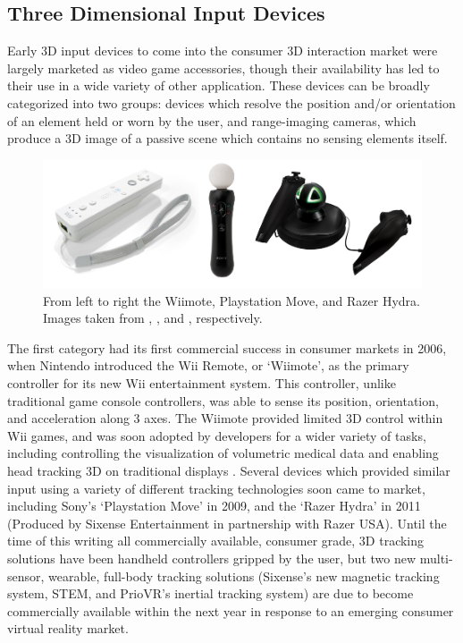 \subsection{Three Dimensional Input Devices}

Early 3D input devices to come into the consumer 3D interaction market were largely marketed as video game accessories, though their availability has led to their use in a wide variety of other application. These devices can be broadly categorized into two groups: devices which resolve the position and/or orientation of an element held or worn by the user, and range-imaging cameras, which produce a 3D image of a passive scene which contains no sensing elements itself.

\begin{figure}[ht!]
\centering
\includegraphics[width=1.0\textwidth]{images/motion-controllers.png}
\caption{From left to right the Wiimote, Playstation Move, and Razer Hydra. Images taken from \protect\cite{wiimote-image}, \protect\cite{ps-move-image}, and \protect\cite{hydra-image}, respectively.}
\label{fig:motion-controllers}
\end{figure}

The first category had its first commercial success in consumer markets in 2006, when Nintendo introduced the Wii Remote, or `Wiimote', as the primary controller for its new Wii entertainment system. This controller, unlike traditional game console controllers, was able to sense its position, orientation, and acceleration along 3 axes. The Wiimote provided limited 3D control within Wii games, and was soon adopted by developers for a wider variety of tasks, including controlling the visualization of volumetric medical data \cite{wiimote-medical} and enabling head tracking 3D on traditional displays \cite{hacking-the-wiimote}. Several devices which provided similar input using a variety of different tracking technologies soon came to market, including Sony's `Playstation Move' in 2009, and the `Razer Hydra' in 2011 (Produced by Sixense Entertainment in partnership with Razer USA). Until the time of this writing all commercially available, consumer grade, 3D tracking solutions have been handheld controllers gripped by the user, but two new multi-sensor, wearable, full-body tracking solutions (Sixense's new magnetic tracking system, STEM, and PrioVR's inertial tracking system) are due to become commercially available within the next year in response to an emerging consumer virtual reality market.
 

